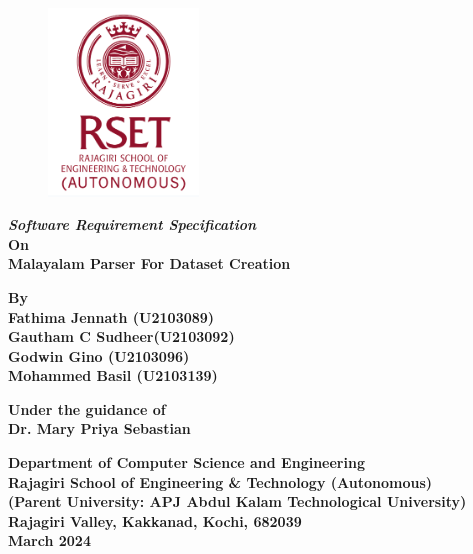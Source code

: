 \documentclass[12pt]{article}
\begin{document}
	
	
	\begin{figure}[t]
		\centering
		\includegraphics[width=4cm]{RSET.png}
		\bigskip
	\end{figure}
	
	
	\begin{center}
		
		
		\textbf{\textit{
				{\fontsize{16pt}{19.2pt}\selectfont
					Software Requirement Specification}}\medskip
			{\fontsize{14pt}{16.8pt}\selectfont
				\\On\medskip\\Malayalam Parser For Dataset Creation}
		}
		
		
		\vspace{1cm}
		
		
		{\fontsize{14pt}{16.8pt}\selectfont
			\textbf{
				By\\
				Fathima Jennath (U2103089)\\
				Gautham C Sudheer(U2103092)\\
				Godwin Gino (U2103096)\\
				Mohammed Basil (U2103139)
			}
			
			\vspace{2cm}
			
			
			\textbf{
				Under the guidance of\\
				Dr. Mary Priya Sebastian\\
			}
			
			\bigskip
			
			
			\textbf{
				Department of Computer Science and Engineering\\
				Rajagiri School of Engineering \& Technology (Autonomous)\\
				(Parent University: APJ Abdul Kalam Technological University)\\
				Rajagiri Valley, Kakkanad, Kochi, 682039\\
				March 2024
			}
		}   
		
	\end{center}
	
\end{document}
